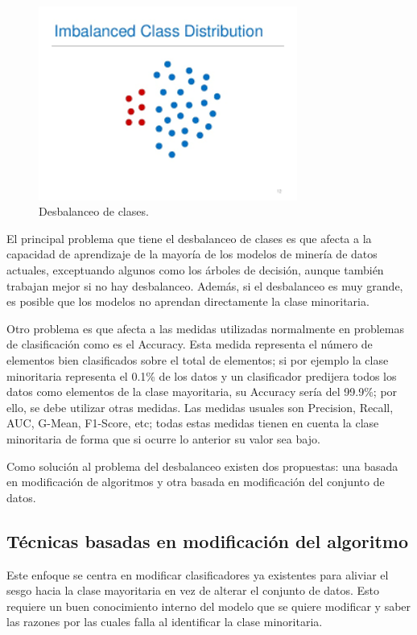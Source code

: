 \begin{figure}[H]
	\centering
	\includegraphics[width=85mm]{imagenes/imbalance_class.png}
	\caption{Desbalanceo de clases.}
	\label{fig:24}
\end{figure}
\verticalspace

El principal problema que tiene el desbalanceo de clases es que afecta a la capacidad de aprendizaje de la mayoría de los modelos de minería de datos actuales, exceptuando algunos como los árboles de decisión, aunque también trabajan mejor si no hay desbalanceo. Además, si el desbalanceo es muy grande, es posible que los modelos no aprendan directamente la clase minoritaria.\newline

Otro problema es que afecta a las medidas utilizadas normalmente en problemas de clasificación como es el Accuracy. Esta medida representa el número de elementos bien clasificados sobre el total de elementos; si por ejemplo la clase minoritaria representa el 0.1\% de los datos y un clasificador predijera todos los datos como elementos de la clase mayoritaria, su Accuracy sería del 99.9\%; por ello, se debe utilizar otras medidas. Las medidas usuales son Precision, Recall, AUC, G-Mean, F1-Score, etc; todas estas medidas tienen en cuenta la clase minoritaria de forma que si ocurre lo anterior su valor sea bajo.\newline
\newpage

Como solución al problema del desbalanceo existen dos propuestas: una basada en modificación de algoritmos y otra basada en modificación del conjunto de datos.
\subsection{Técnicas basadas en modificación del algoritmo}
Este enfoque se centra en modificar clasificadores ya existentes para aliviar el sesgo hacia la clase mayoritaria en vez de alterar el conjunto de datos. Esto requiere un buen conocimiento interno del modelo que se quiere modificar y saber las razones por las cuales falla al identificar la clase minoritaria.\newline

